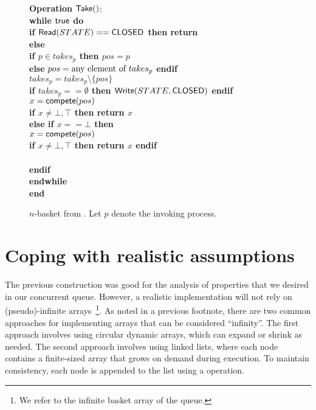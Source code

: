 \begin{figure}[ht!]
{{\begin{minipage}[t]{180mm}
\begin{tabbing}
{\bf Operation} ${\sf Take}()$: \\
 \> {\bf while \({\sf true}\) do}\\
 \> \> {\bf if \({\sf Read}(STATE) == {\sf CLOSED}\) then return \closed} \\
 \> \> {\bf else} \\
 \> \> \> {\bf if \(p \in takes_p\) then \(pos = p\)} \\
 \> \> \> {\bf else} \(pos = \hbox{any element of } takes_p\) {\bf endif} \\
 \> \> \> \(takes_p =  takes_p \setminus \{pos\}\) \\
 \> \> \> {\bf if \(takes_p == \emptyset\) then \({\sf Write}(STATE, {\sf CLOSED})\) endif} \\
 \> \> \> \( x = {\sf compete}(pos) \) \\
 \> \> \> {\bf if \(x \neq \bot, \top \) then return \(x\)} \\
 \> \> \> {\bf else if \(x == \bot\) then} \\
 \> \> \> \> \( x = {\sf compete}(pos) \) \\
 \> \> \> \> {\bf if \(x \neq \bot, \top \) then return \(x\) endif} \\
 \> \>  \\
 \> \> {\bf endif} \\
 \> {\bf endwhile}\\
{\bf end \Take}
\end{tabbing}
\end{minipage}}
\caption{\label{basket-2}$n$-basket from \CAS. Let $p$ denote the invoking process.}
}
\end{figure}

\section{Coping with realistic assumptions}

The previous construction was good for the analysis of properties that we desired in our concurrent queue. However, a realistic implementation will not rely on (pseudo)-infinite arrays~\footnote{We refer to the infinite basket array of the queue.}. As noted in a previous footnote, there are two common approaches for implementing arrays that can be considered ``infinity''. The first approach involves using circular dynamic arrays, which can expand or shrink as needed. The second approach involves using linked lists, where each node contains a finite-sized array that grows on demand during execution. To maintain consistency, each node is appended to the list using a \CAS operation.

